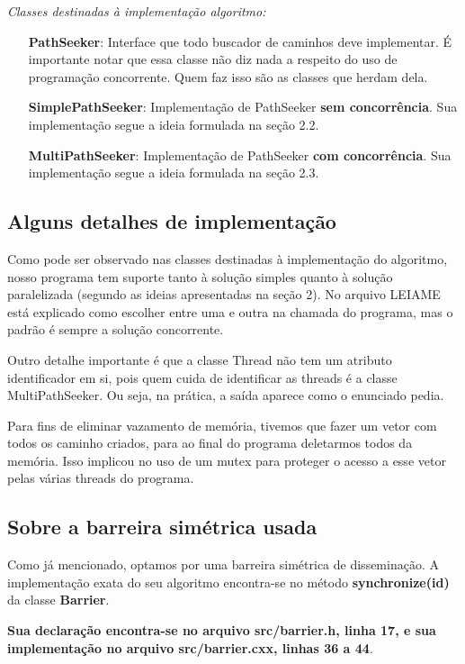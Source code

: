 \documentclass[a4paper,11pt]{article}
\begin{document}
    \textit{Classes destinadas à implementação algoritmo:}
    \begin{itemize}
      \item[\textbf{PathSeeker}:]
        Interface que todo buscador de caminhos deve implementar. É importante
        notar que essa classe não diz nada a respeito do uso de programação
        concorrente. Quem faz isso são as classes que herdam dela.
      \item[\textbf{SimplePathSeeker}:]
        Implementação de PathSeeker \textbf{sem concorrência}. Sua implementação
        segue a ideia formulada na seção 2.2.
      \item[\textbf{MultiPathSeeker}:]
        Implementação de PathSeeker \textbf{com concorrência}. Sua implementação
        segue a ideia formulada na seção 2.3.
    \end{itemize}

  \subsection{Alguns detalhes de implementação}
    Como pode ser observado nas classes destinadas à implementação do algoritmo,
    nosso programa tem suporte tanto à solução simples quanto à solução
    paralelizada (segundo as ideias apresentadas na seção 2). No arquivo LEIAME
    está explicado como escolher entre uma e outra na chamada do programa, mas
    o padrão é sempre a solução concorrente.

    Outro detalhe importante é que a classe Thread não tem um atributo
    identificador em si, pois quem cuida de identificar as threads é a classe
    MultiPathSeeker. Ou seja, na prática, a saída aparece como o enunciado
    pedia.

    Para fins de eliminar vazamento de memória, tivemos que fazer um vetor com
    todos os caminho criados, para ao final do programa deletarmos todos da
    memória. Isso implicou no uso de um mutex para proteger o acesso a esse
    vetor pelas várias threads do programa.

  \subsection{Sobre a barreira simétrica usada}
    Como já mencionado, optamos por uma barreira simétrica de disseminação. A
    implementação exata do seu algoritmo encontra-se no método
    \textbf{synchronize(id)} da classe \textbf{Barrier}.

    \textbf{Sua declaração encontra-se no arquivo src/barrier.h, linha 17, e sua
    implementação no arquivo src/barrier.cxx, linhas 36 a 44}.
\end{document}
